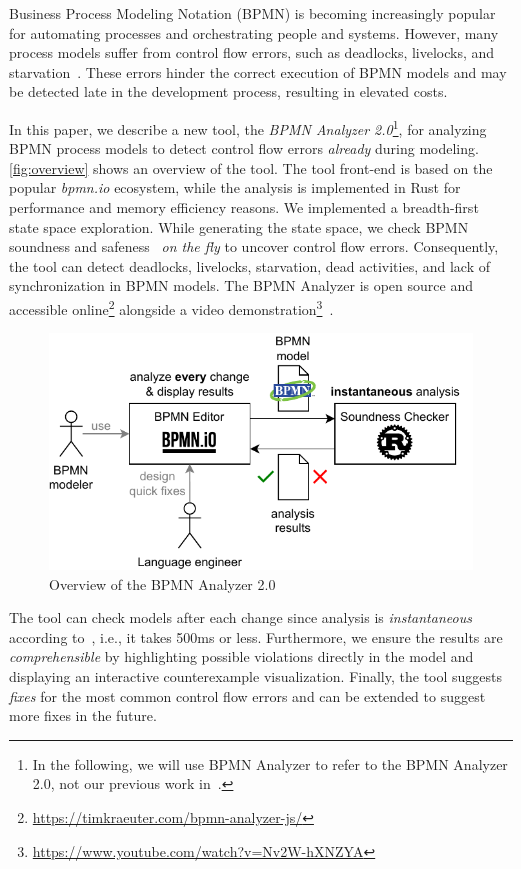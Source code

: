 \documentclass[
onecolumn, %
]{ceurart}
\begin{document}
Business Process Modeling Notation (BPMN) is becoming increasingly popular for automating processes and orchestrating people and systems.
However, many process models suffer from control flow errors, such as deadlocks, livelocks, and starvation~\cite{fahlandAnalysisDemandInstantaneous2011}.
These errors hinder the correct execution of BPMN models and may be detected late in the development process, resulting in elevated costs.

In this paper, we describe a new tool, the \textit{BPMN Analyzer 2.0}\footnote{
In the following, we will use BPMN Analyzer to refer to the BPMN Analyzer 2.0, not our previous work in~\cite{krauterHigherorderTransformationApproach2024}.}, for analyzing BPMN process models to detect control flow errors \textit{already} during modeling.
\autoref{fig:overview} shows an overview of the tool.
The tool front-end is based on the popular \textit{bpmn.io} ecosystem, while the analysis is implemented in Rust for performance and memory efficiency reasons.
We implemented a breadth-first state space exploration.
While generating the state space, we check BPMN soundness and safeness~\cite{corradiniClassificationBPMNCollaborations2018} \textit{on the fly} to uncover control flow errors.
Consequently, the tool can detect deadlocks, livelocks, starvation, dead activities, and lack of synchronization in BPMN models.
The BPMN Analyzer is open source and accessible online\footnote{\url{https://timkraeuter.com/bpmn-analyzer-js/}} alongside a video demonstration\footnote{\url{https://www.youtube.com/watch?v=Nv2W-hXNZYA}}~\cite{krauterInstantaneousComprehensibleFixable2024}.

\begin{figure}[ht]
	\centering
	\includegraphics[width=0.5\linewidth]{images/overview}
	\caption{Overview of the BPMN Analyzer 2.0}
	\label{fig:overview}
\end{figure}

The tool can check models after each change since analysis is \textit{instantaneous} according to~\cite{fahlandAnalysisDemandInstantaneous2011}, i.e., it takes 500ms or less.
Furthermore, we ensure the results are \textit{comprehensible} by highlighting possible violations directly in the model and displaying an interactive counterexample visualization.
Finally, the tool suggests \textit{fixes} for the most common control flow errors and can be extended to suggest more fixes in the future.
\end{document}
